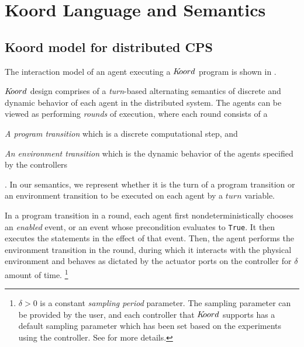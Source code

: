 \section{Koord Language and Semantics}
\subsection{Koord model for distributed CPS}

The interaction model of an agent executing a $K\kern-2pt oord$ program is shown in . 

$K\kern-2pt oord$ design comprises of a \emph{turn}-based alternating semantics of discrete and dynamic behavior of each agent in the distributed system. The agents can be viewed as performing \emph{rounds} of execution, where each round consists of a \begin{inparaenum} \item \emph{A program transition} which is a discrete computational step, and \item \emph{An environment transition} which is the dynamic behavior of the agents specified by the controllers \end{inparaenum}. In our semantics, we represent whether it is the turn of a program transition or an environment transition to be executed on each agent by a $\mathit{turn}$ variable.  

In a program transition in a round, each agent first nondeterministically chooses an \emph{enabled} event, or an event whose precondition evaluates to \verb|True|. It then executes the statements in the effect of that event. %
Then, the agent performs the environment transition in the round, during which it interacts with the physical environment and behaves as dictated by the actuator ports on the controller for $\delta$ amount of time.  \footnote{ $\delta>0$ is a constant \emph{sampling period} parameter. The sampling parameter can be provided by the user, and each controller that $K\kern-2pt oord$ supports has a default sampling parameter which has been set based on the experiments using the controller. See  for more details.} %

